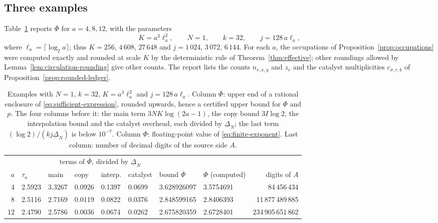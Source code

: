 \subsection{Three examples}
\label{subsec:finite-examples}

Table~\ref{tab:finite-multiway} reports \(\overline\Phi\) for
\(a=4,8,12\), with the parameters
\[
 K=a^3\ell_a^2,\qquad N=1,\qquad k=32,\qquad j=128\,a\ell_a,
\]
where \(\ell_a=\lceil\log_2a\rceil\); thus \(K=256\), \(4\,608\),
\(27\,648\) and \(j=1\,024\), \(3\,072\), \(6\,144\). For each \(a\), the
occupations of Proposition~\ref{prop:occupations} were computed exactly
and rounded at scale \(K\) by the deterministic rule of
Theorem~\ref{thm:effective}; other roundings allowed by
Lemma~\ref{lem:circulation-rounding} give other counts. The report lists
the counts \(n_{r,x,y}\) and \(z_r\) and the catalyst multiplicities
\(c_{\sigma,r,b}\) of Proposition~\ref{prop:rounded-ledger}.

\begin{table}[ht]
\centering
\small
\setlength{\tabcolsep}{4pt}
\begin{tabular}{rlllllllr}
\toprule
&&\multicolumn{4}{c}{terms of \(\overline\Phi\), divided by
 \(\underline\Delta_N\)}&&&\\
\cmidrule(lr){3-6}
\(a\)&\(\tau_a\)&main&copy&interp.&catalyst
 &bound \(\overline\Phi\)&\(\Phi\) (computed)&digits of \(A\)\\
\midrule
4&2.5923&3.3267&0.0926&0.1397&0.0699&3.628926097&3.5754691
 &84\,456\,434\\
8&2.5116&2.7169&0.0119&0.0822&0.0376&2.848599165&2.8406393
 &11\,877\,489\,885\\
12&2.4790&2.5786&0.0036&0.0674&0.0262&2.675820359&2.6728401
 &234\,905\,651\,862\\
\bottomrule
\end{tabular}
\caption{Examples with \(N=1\), \(k=32\), \(K=a^3\ell_a^2\) and
\(j=128\,a\ell_a\). Column \(\overline\Phi\): upper end of a rational
enclosure of \eqref{eq:sufficient-expression}, rounded upwards, hence a
certified upper bound for \(\Phi\) and \(p\). The four columns before it:
the main term \(3NK\log(2a-1)\), the copy bound \(3I\log2\), the
interpolation bound and the catalyst overhead, each divided by
\(\underline\Delta_N\); the last term
\((\log2)/(kj\underline\Delta_N)\) is below \(10^{-7}\). Column \(\Phi\):
floating-point value of \eqref{eq:finite-exponent}. Last column: number
of decimal digits of the source side \(A\).}
\label{tab:finite-multiway}
\end{table}


